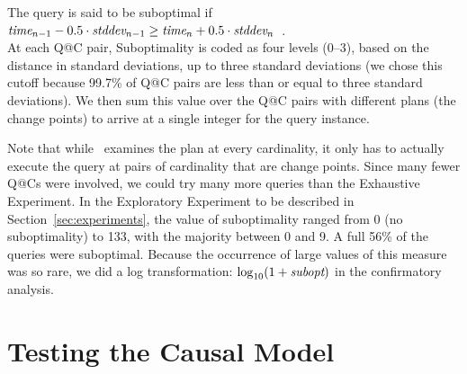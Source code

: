 \documentclass[prodmode,acmtods]{acmsmall}
\makeatletter
\def\azdb{\doubleblind{\hbox{\sc AZDBLab}}{\hbox{\sc DBLab}}}
\def\QatC{Q{@}C}
\makeatother
\begin{document}
The query is said to be suboptimal if
$\hbox{\em time}_{n-1} - 0.5 \cdot \hbox{\em stddev}_{n-1} \geq \hbox{\em
time}_n + 0.5 \cdot \hbox{\em stddev}_n$~.\\
At each Q@C pair, Suboptimality is coded as four levels (0--3), based on the distance in 
standard deviations, up to three standard deviations (we chose this cutoff
because 99.7\% of Q@C pairs are less than or equal to three standard
deviations). 
We then sum this value over the Q@C pairs with different plans
(the change points) to arrive at a single integer for the query instance.

Note that while \azdb\ examines the plan at every cardinality, it only has
to actually execute the query at pairs of cardinality that are change
points.  Since many fewer {\QatC}s were involved, we could try many more
queries than the \hbox{Exhaustive} \hbox{Experiment}. In the Exploratory Experiment to be
described in Section~\ref{sec:experiments}, the value of suboptimality ranged
from 0 (no suboptimality) to 133, with the majority between 0 and 9. A full 56\% of
the queries were suboptimal.  \hbox{Because} the occurrence of large values of this
measure was so rare, we did a log transformation: $\log_{10} (1 + \mbox{\em
  subopt})$ in the confirmatory analysis.

\section{Testing the Causal Model}
\end{document}
